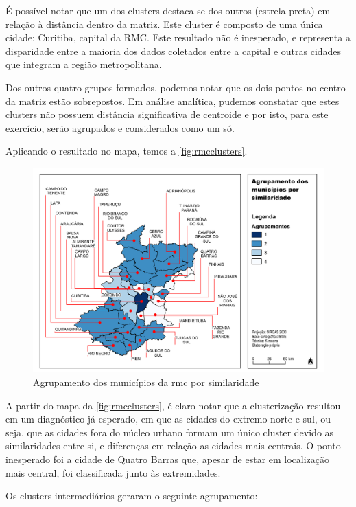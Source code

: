 	É possível notar que um dos clusters destaca-se dos outros (estrela preta) em relação à distância dentro da matriz. Este cluster é composto de uma única cidade: Curitiba, capital da RMC. Este resultado não é inesperado, e representa a disparidade entre a maioria dos dados coletados entre a capital e outras cidades que integram a região metropolitana.
	
	Dos outros quatro grupos formados, podemos notar que os dois pontos no centro da matriz estão sobrepostos. Em análise analítica, pudemos constatar que estes clusters não possuem distância significativa de centroide e por isto, para este exercício, serão agrupados e considerados como um só.
	
	Aplicando o resultado no mapa, temos a \autoref{fig:rmcclusters}.
	
	\begin{landscape}
		\begin{figure}
			\centering
			\caption{Agrupamento dos municípios da \glsdesc{rmc} por similaridade}
			\label{fig:rmcclusters}
			\includegraphics[width=0.85\linewidth]{../gis/produtos/RMC_clusters}
		\end{figure}
	\end{landscape}

	A partir do mapa da \autoref{fig:rmcclusters}, é claro notar que a clusterização resultou em um diagnóstico já esperado, em que as cidades do extremo norte e sul, ou seja, que as cidades fora do núcleo urbano formam um único cluster devido as similaridades entre si, e diferenças em relação as cidades mais centrais. O ponto inesperado foi a  cidade de Quatro Barras que, apesar de estar em localização mais central, foi classificada junto às extremidades.
	
	Os clusters intermediários geraram o seguinte agrupamento:
	
